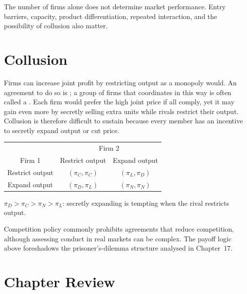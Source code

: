 The number of firms alone does not determine market performance. Entry
barriers, capacity, product differentiation, repeated interaction, and the
possibility of collusion also matter.

\section{Collusion}

Firms can increase joint profit by restricting output as a monopoly would. An
agreement to do so is ; a group of firms that coordinates
in this way is often called a . Each firm would prefer the
high joint price if all comply, yet it may gain even more by secretly selling
extra units while rivals restrict their output. Collusion is therefore
difficult to sustain because every member has an incentive to secretly expand
output or cut price.

\begin{center}
\small
\begin{tabular}{c c c}
\toprule
 & \multicolumn{2}{c}{Firm 2} \\
Firm 1 & Restrict output & Expand output \\
\midrule
Restrict output & $(\pi_C,\pi_C)$ & $(\pi_L,\pi_D)$ \\
Expand output & $(\pi_D,\pi_L)$ & $(\pi_N,\pi_N)$ \\
\bottomrule
\end{tabular}

\vspace{0.35em}
$\pi_D>\pi_C>\pi_N>\pi_L$: secretly expanding is tempting when the rival
restricts output.
\end{center}

Competition policy commonly prohibits agreements that reduce competition,
although assessing conduct in real markets can be complex. The payoff logic
above foreshadows the prisoner's-dilemma structure analysed in Chapter~17.

\section*{Chapter Review}

